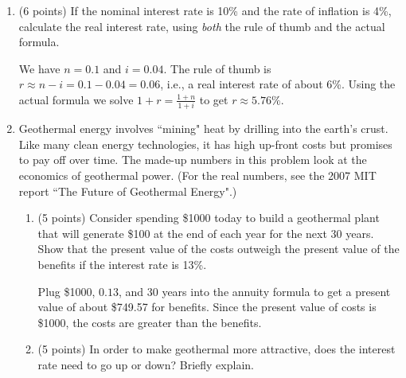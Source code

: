 \documentclass[twoside]{article}
\begin{document}
\begin{enumerate}
\begin{enumerate}
    \end{enumerate}






\item \begin{EXAM}(6 points) If the nominal interest rate is 10\% and the rate of inflation is 4\%, calculate the real interest rate, using \emph{both} the rule of thumb and the actual formula. \clearpage\end{EXAM}

\begin{KEY}
We have $n=0.1$ and $i=0.04$. The rule of thumb is $r\approx n-i =0.1-0.04=0.06$, i.e., a real interest rate of about 6\%. Using the actual formula we solve $1+r=\frac{1+n}{1+i}$ to get $r\approx 5.76\%$.
\end{KEY}





\item \begin{EXAM} Geothermal energy involves ``mining" heat by drilling into the earth's crust. Like many clean energy technologies, it has high up-front costs but promises to pay off over time. The made-up numbers in this problem look at the economics of geothermal power. (For the real numbers, see the 2007 MIT report ``The Future of Geothermal Energy".) \end{EXAM}

    \begin{enumerate}

    \item \begin{EXAM} (5 points) Consider spending \$1000 today to build a geothermal plant that will generate \$100 at the end of each year for the next 30 years. Show that the present value of the costs outweigh the present value of the benefits if the interest rate is 13\%. \vspace{2in} \end{EXAM}

\begin{KEY}
Plug \$1000, $0.13$, and 30 years into the annuity formula to get a present value of about \$749.57 for benefits. Since the present value of costs is \$1000, the costs are greater than the benefits.
\end{KEY}


    \item \begin{EXAM} (5 points) In order to make geothermal more attractive, does the interest rate need to go up or down? Briefly explain. \vspace{1in}  \end{EXAM}


\end{enumerate}
\end{enumerate}
\end{document}

